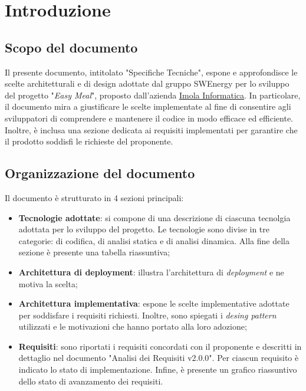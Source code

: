 \section{Introduzione}

\subsection{Scopo del documento}

Il presente documento, intitolato "Specifiche Tecniche", espone e approfondisce
le scelte architetturali e di design adottate dal gruppo SWEnergy per lo
sviluppo del progetto "\textit{Easy Meal}", proposto dall'azienda \href{https://imolainformatica.it}{Imola Informatica}.
In particolare, il documento mira a giustificare le
scelte implementate al fine di consentire agli sviluppatori di comprendere e
mantenere il codice in modo efficace ed efficiente. Inoltre, è inclusa una
sezione dedicata ai requisiti implementati per garantire che il prodotto
soddisfi le richieste del proponente.

\subsection{Organizzazione del documento}

Il documento è strutturato in 4 sezioni principali:

\begin{itemize}
	\item \textbf{Tecnologie adottate}: si compone di una descrizione di
	      ciascuna tecnolgia adottata per lo sviluppo del progetto.
	      Le tecnologie sono divise in tre categorie: di codifica,
	      di analisi statica e di analisi dinamica. Alla fine della sezione è
	      presente una tabella riassuntiva;

	\item \textbf{Architettura di deployment}: illustra l'architettura di
	      \textit{deployment} e ne motiva la scelta;

	\item \textbf{Architettura implementativa}: espone le scelte implementative
	      adottate per soddisfare i requisiti richiesti. Inoltre, sono spiegati
	      i \textit{desing pattern} utilizzati e le motivazioni che hanno
	      portato alla loro adozione;

	\item \textbf{Requisiti}: sono riportati i requisiti concordati con il
	      proponente e descritti in dettaglio nel documento "Analisi dei
	      Requisiti v2.0.0". Per ciascun requisito è indicato lo
	      stato di implementazione. Infine, è presente un grafico riassuntivo
	      dello stato di avanzamento dei requisiti.
\end{itemize}


